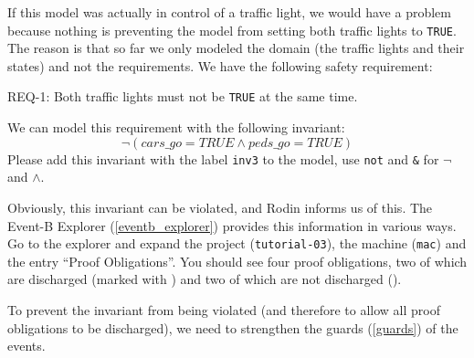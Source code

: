 If this model was actually in control of a traffic light, we would have a problem because nothing is preventing the model from setting both traffic lights to \texttt{TRUE}.  The reason is that so far we only modeled the domain (the traffic lights and their states) and not the requirements.  We have the following safety requirement:

\begin{center}REQ-1: Both traffic lights must not be \texttt{TRUE} at the same time.\end{center}

We can model this requirement with the following invariant:
\[
\lnot  (cars\_go = TRUE \land  peds\_go = TRUE)
\]
Please add this invariant with the label \texttt{inv3} to the model, use \texttt{not} and \texttt{\&} for $\lnot$ and $\land$.

Obviously, this invariant can be violated, and Rodin informs us of this.  The \textsf{Event-B Explorer} (\ref{eventb_explorer}) provides this information in various ways.  Go to the explorer and expand the project (\texttt{tutorial-03}), the machine (\texttt{mac}) and the entry ``Proof Obligations''.
You should see four proof obligations, two of which are discharged (marked with ) and two of which are not discharged ().


To prevent the invariant from being violated (and therefore to allow all proof obligations to be discharged), we need to strengthen the guards (\ref{guards}) of the events.


